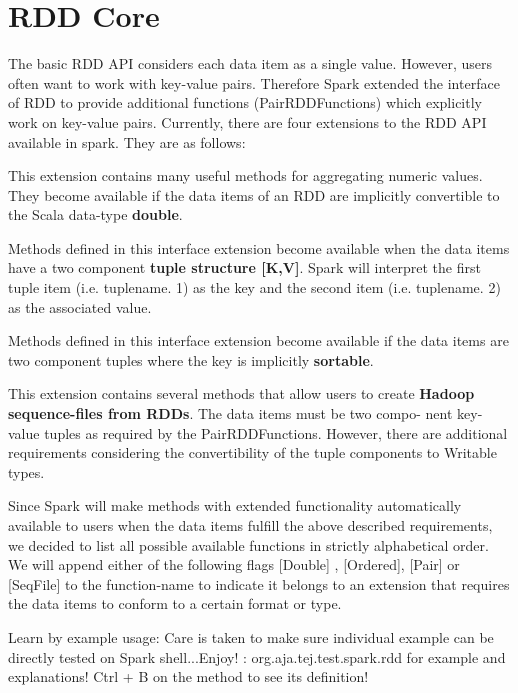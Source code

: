 \section{RDD Core}
The basic RDD API considers each data item as a single value. However, users often
want to work with key-value pairs. Therefore Spark extended the interface of RDD
to provide additional functions (PairRDDFunctions) which explicitly work on key-value
pairs. Currently, there are four extensions to the RDD API available in spark. They are
as follows:

\bDoubleRDDFunctions This extension contains many useful methods for aggregating
numeric values. They become available if the data items of an RDD are implicitly
convertible to the Scala data-type \textbf{double}.

\bPairRDDFunctions Methods defined in this interface extension become available when
the data items have a two component \textbf{tuple structure [K,V]}. Spark will interpret the first
tuple item (i.e. tuplename. 1) as the key and the second item (i.e. tuplename. 2)
as the associated value.

\bOrderedRDDFunctions Methods defined in this interface extension become available if
the data items are two component tuples where the key is implicitly \textbf{sortable}.

\bSequenceFileRDDFunctions This extension contains several methods that allow users
to create \textbf{Hadoop sequence-files from RDDs}. The data items must be two compo-
nent key-value tuples as required by the PairRDDFunctions. However, there are
additional requirements considering the convertibility of the tuple components to
Writable types.

Since Spark will make methods with extended functionality automatically available
to users when the data items fulfill the above described requirements, we decided to list
all possible available functions in strictly alphabetical order. We will append either of
the following flags [Double] , [Ordered], [Pair] or [SeqFile] to the function-name to indicate it
belongs to an extension that requires the data items to conform to a certain format or
type.

Learn by example usage:
Care is taken to make sure individual example can be directly tested on Spark shell...Enjoy!
\bRefer: org.aja.tej.test.spark.rdd for example and explanations!
Ctrl + B on the method to see its definition!